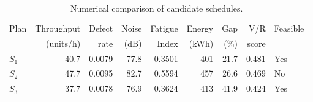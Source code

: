 \begin{table}[htbp]
\centering
\caption{Numerical comparison of candidate schedules.}
\label{tab:numerical-sim}
\small
\begin{tabular}{@{}lrrrrrrrl@{}}
\toprule
Plan & Throughput & Defect & Noise & Fatigue & Energy & Gap & V/R & Feasible \\
     & (units/h)  & rate   & (dB)  & Index   & (kWh)  & (\%) & score &         \\
\midrule
$S_{1}$ & 40.7 & 0.0079 & 77.8 & 0.3501 & 401 & 21.7 & 0.481 & Yes \\
$S_{2}$ & 47.7 & 0.0095 & 82.7 & 0.5594 & 457 & 26.6 & 0.469 & No \\
$S_{3}$ & 37.7 & 0.0078 & 76.9 & 0.3624 & 413 & 41.9 & 0.424 & Yes \\
\bottomrule
\end{tabular}
\end{table}
